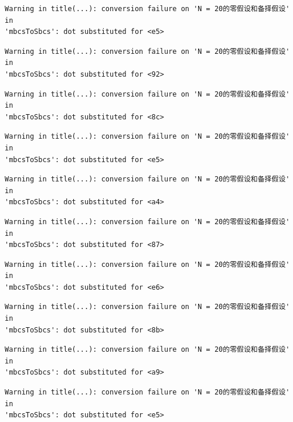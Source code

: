 \documentclass[
  letterpaper,
  DIV=11,
  numbers=noendperiod]{scrreprt}
\begin{document}
\begin{verbatim}
Warning in title(...): conversion failure on 'N = 20的零假设和备择假设' in
'mbcsToSbcs': dot substituted for <e5>
\end{verbatim}

\begin{verbatim}
Warning in title(...): conversion failure on 'N = 20的零假设和备择假设' in
'mbcsToSbcs': dot substituted for <92>
\end{verbatim}

\begin{verbatim}
Warning in title(...): conversion failure on 'N = 20的零假设和备择假设' in
'mbcsToSbcs': dot substituted for <8c>
\end{verbatim}

\begin{verbatim}
Warning in title(...): conversion failure on 'N = 20的零假设和备择假设' in
'mbcsToSbcs': dot substituted for <e5>
\end{verbatim}

\begin{verbatim}
Warning in title(...): conversion failure on 'N = 20的零假设和备择假设' in
'mbcsToSbcs': dot substituted for <a4>
\end{verbatim}

\begin{verbatim}
Warning in title(...): conversion failure on 'N = 20的零假设和备择假设' in
'mbcsToSbcs': dot substituted for <87>
\end{verbatim}

\begin{verbatim}
Warning in title(...): conversion failure on 'N = 20的零假设和备择假设' in
'mbcsToSbcs': dot substituted for <e6>
\end{verbatim}

\begin{verbatim}
Warning in title(...): conversion failure on 'N = 20的零假设和备择假设' in
'mbcsToSbcs': dot substituted for <8b>
\end{verbatim}

\begin{verbatim}
Warning in title(...): conversion failure on 'N = 20的零假设和备择假设' in
'mbcsToSbcs': dot substituted for <a9>
\end{verbatim}

\begin{verbatim}
Warning in title(...): conversion failure on 'N = 20的零假设和备择假设' in
'mbcsToSbcs': dot substituted for <e5>
\end{verbatim}
\end{document}
